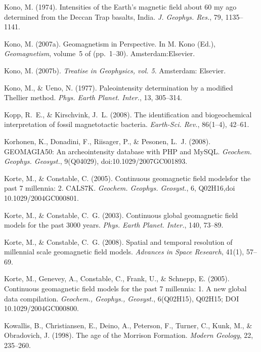 \documentclass[,plain]{tauxe}
\begin{document}
\begin{thebibliography}{}
\bibitem{}%
Kono, M. (1974).
Intensities of the Earth's magnetic field about 60 my ago determined from the Deccan Trap basalts, India.
{\it J. Geophys. Res.}, 79, 1135--1141.

\bibitem{}%
Kono, M. (2007a).
Geomagnetism in Perspective.\break
In M. Kono (Ed.), {\it Geomagnetism}, volume~5 of (pp.\ 1--30). Amsterdam:\hspace*{-3pt}\break Elsevier.

\bibitem{}%
Kono, M. (2007b).
{\it Treatise in Geophysics, vol. 5}. Amsterdam: 
Elsevier.

\bibitem{}%
Kono, M., \& Ueno, N. (1977).
Paleointensity determination by a modified Thellier method.
{\it Phys. Earth Planet. Inter.}, 13, 305--314.

\bibitem{}%
Kopp, R.~E., \& Kirschvink, J.~L. (2008).
The identification and biogeochemical interpretation of fossil magnetotactic bacteria.
{\it Earth-Sci. Rev.}, 86(1--4), 42--61.

\bibitem{}%
Korhonen, K., Donadini, F., Riisager, P., \& Pesonen, L.~J. (2008).
GEOMAGIA50: An archeointensity database with PHP and MySQL.
{\it Geochem. Geophys. Geosyst.}, 9(Q04029), doi:10.1029/2007GC001893.

\bibitem{}%
Korte, M., \& Constable, C. (2005).\break
Continuous geomagnetic field models\break for the past 7 millennia: 2. CALS7K.\break
{\it Geochem. Geophys. Geosyst.}, 6, Q02H16,\break doi 10.1029/2004GC000801.

\bibitem{}%
Korte, M., \& Constable, C.~G. (2003).
Continuous global geomagnetic field models for the past 3000 years.
{\it Phys. Earth Planet. Inter.}, 140, 73--89.

\bibitem{}%
Korte, M., \& Constable, C.~G. (2008).
Spatial and temporal resolution of millennial scale geomagnetic field models.
{\it Advances in Space Research}, 41(1), 57--69.

\bibitem{}%
Korte, M., Genevey, A., Constable, C., Frank, U., \& Schnepp, E. (2005).
Continuous geomagnetic field models for the past 7 millennia: 1. A new global data compilation.
{\it Geochem., Geophys., Geosyst.}, 6(Q02H15), Q02H15; DOI 10.1029/2004GC000800.

\bibitem{}%
Kowallis, B., Christiansen, E., Deino, A., Peterson, F., Turner, C., Kunk, M., \& Obradovich, J. (1998).
The age of the Morrison Formation.
{\it Modern Geology}, 22, 235--260.


\end{thebibliography}
\end{document}
